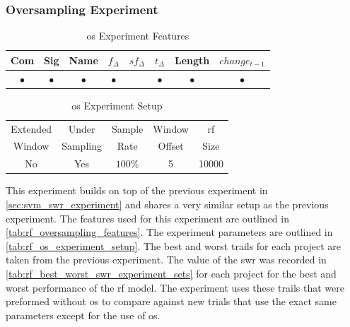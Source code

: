 \subsubsection{Oversampling Experiment}
\label{sec:oversampling_experiment_rf}

\begin{table}[h]
\begin{center}

    \begin{tabular}{|c|c|c|c|c|c|c|c|}
        \hline
        Com & Sig & Name & $f_{\Delta}$ & $sf_{\Delta}$ & $t_\Delta$ & Length & $change_{t-1}$ \\
         \hline
        $\bullet$ & $\bullet$ & $\bullet$ & $\bullet$ & & $\bullet$ & $\bullet$ & $\bullet$ \\ \hline
    \end{tabular}
    \caption{\gls{os} Experiment Features}
    \label{tab:rf_oversampling_features}
\end{center}

\end{table}

\begin{table}[h]
\begin{center}

    \begin{tabular}{|c|c|c|c|c|}
        \hline
        Extended & Under & Sample & Window & \gls{rf} \\
        Window & Sampling & Rate & Offset & Size \\ \hline
        No & Yes & $100\%$ & 5 & 10000 \\ \hline
    \end{tabular}
    \caption{\gls{os} Experiment Setup}
    \label{tab:rf_os_experiment_setup}
\end{center}

\end{table}


This experiment builds on top of the previous experiment in \autoref{sec:svm_swr_experiment} and shares a very similar setup as the previous experiment. The features used for this experiment are outlined in \autoref{tab:rf_oversampling_features}. The experiment parameters are outlined in \autoref{tab:rf_os_experiment_setup}. The best and worst trails for each project are taken from the previous experiment. The value of the \gls{swr} was recorded in \autoref{tab:rf_best_worst_swr_experiment_sets} for each project for the best and worst performance of the \gls{rf} model. The experiment uses these trails that were preformed without \gls{os} to compare against new trials that use the exact same parameters except for the use of \gls{os}.

